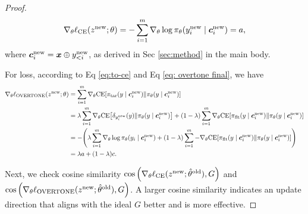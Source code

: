 \begin{proof}

\begin{equation}
\label{eq: baseline direct}
    \nabla_\theta \ell_{\text{CE}}(z^{\text{new}}; \theta) =
    - \sum_{i=1}^m \nabla_\theta \log \pi_\theta (y_i^{\text{new}} \mid {\boldsymbol{c}}_i^{\text{new}}) = a,
\end{equation}
where ${\boldsymbol{c}}_i^{\text{new}} = \boldsymbol{x} \oplus y_{<i}^{\text{new}}$, as derived in Sec \ref{sec:method} in the main body. 

For {\NAME} loss,
according to Eq \eqref{eq:to-ce} and Eq \eqref{eq: overtone final}, we have
\begin{align*}
\nabla_\theta \ell_\NAME(z^\new; \theta) 
&= 
\sum_{i=1}^m \nabla_\theta \ce \qty[ \pit(y \mid \cv_i^\new) \| \pi_\theta(y \mid \cv_i^\new) ]\\
&= 
\lambda \sum_{i=1}^m \nabla_\theta \ce \qty[ \de{y_i^\new}{y} \| \pi_\theta(y \mid \cv_i^\new) ] 
+ (1 - \lambda) \sum_{i=1}^m \nabla_\theta \ce \qty[ \pif(y \mid \cv_i^\new) \| \pi_\theta(y \mid \cv_i^\new) ]\\
&= 
- \qty( \lambda \sum_{i=1}^m \nabla_\theta \log \pil (y_i \mid \cv_i^\new) + (1 - \lambda) \sum_{i=1}^m  - \nabla_\theta \ce \qty[ \pif(y \mid \cv_i^\new) \| \pil (y \mid \cv_i^\new) ])\\
&=
\lambda a + (1 - \lambda) c.
\end{align*}




Next, we check cosine similarity $\cos \qty( \nabla_\theta \ell_{\text{CE}} (z^{\text{new}}; \hat{\theta}^{\text{old}}), G )$ and $\cos \qty( \nabla_\theta \ell_{\text{OVERTONE}} (z^{\text{new}}; \hat{\theta}^{\text{old}}), G )$.
A larger cosine similarity indicates an update direction that aligns with the ideal $G$ better and is more effective. 


\end{proof}

